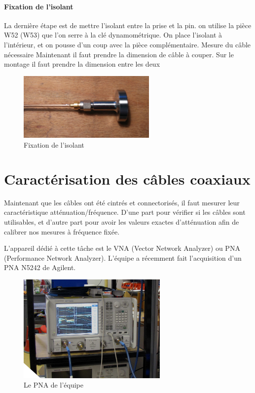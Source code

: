\paragraph*{Fixation de l’isolant}  La dernière étape est de mettre l’isolant entre la prise et la pin. on
utilise la pièce W52 (W53) que l’on serre à la clé dynamométrique. On place l’isolant à
l’intérieur, et on pousse d’un coup avec la pièce complémentaire.
Mesure du câble nécessaire Maintenant il faut prendre la dimension de câble à couper.
Sur le montage il faut prendre la dimension entre les deux{}
\begin{figure}[h]
    \begin{center}
        \includegraphics[width=0.60\textwidth]{Images/Coax/6}
        \caption{Fixation de l’isolant}
        \label{coax_fixation_isolant}
    \end{center}
\end{figure}








\newpage
\section{Caractérisation des câbles coaxiaux}

Maintenant que les câbles ont été cintrés et connectorisés, il faut mesurer leur caractéristique atténuation/fréquence. D'une part pour vérifier si les câbles sont utilisables, et d'autre part pour avoir les valeurs exactes d'atténuation afin de calibrer nos mesures à fréquence fixée.

L'appareil dédié à cette tâche est le VNA (Vector Network Analyzer) ou PNA (Performance Network Analyzer). L'équipe a récemment fait l'acquisition d'un PNA N5242 de Agilent.

\begin{figure}[h]
    \begin{center}
        \includegraphics[width=0.65\textwidth]{Images/VNA}
        \caption{Le PNA de l'équipe}
        \label{PNA}
    \end{center}
\end{figure}

